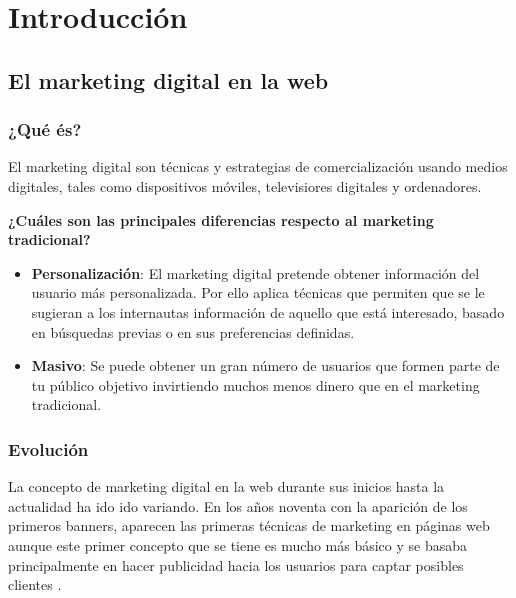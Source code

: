 \chapter{Introducción}


\section{El marketing digital en la web}


\subsection{¿Qué és?}

El marketing digital son técnicas y estrategias de comercialización usando medios digitales, tales como dispositivos móviles, televisiores digitales y ordenadores.

\vspace{5 mm}

\textbf{¿Cuáles son las principales diferencias respecto al marketing tradicional?} 

\vspace{5 mm}

\begin{itemize}

\item \textbf{Personalización}: El marketing digital pretende obtener información del usuario más personalizada. Por ello aplica técnicas que permiten que se le sugieran a los internautas información de aquello que está interesado, basado en búsquedas previas o en sus preferencias definidas.

\item \textbf{Masivo}: Se puede obtener un gran número de usuarios que formen parte de tu público objetivo invirtiendo muchos menos dinero que en el marketing tradicional.


\end{itemize}

\subsection{Evolución}

La concepto de marketing digital en la web durante sus inicios hasta la actualidad ha ido ido variando. En los años noventa con la aparición de los primeros banners, aparecen las primeras técnicas de marketing en páginas web aunque este primer concepto que se tiene es mucho más básico y se basaba principalmente en hacer publicidad hacia los usuarios para captar posibles clientes \cite{marketing-evolution}.

